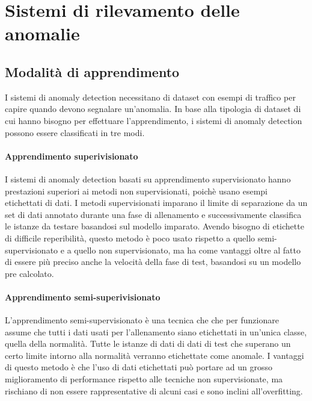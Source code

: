 \section{Sistemi di rilevamento delle anomalie}

\subsection{Modalità di apprendimento}


I sistemi di anomaly detection necessitano di dataset con esempi di traffico per capire quando devono segnalare un'anomalia. In base alla tipologia di dataset di cui hanno bisogno per effettuare l'apprendimento, i sistemi di anomaly detection possono essere classificati in tre modi.

\paragraph{Apprendimento superivisionato}

I sistemi di anomaly detection basati su apprendimento supervisionato hanno prestazioni superiori ai metodi non supervisionati, poichè usano esempi etichettati di dati. I metodi supervisionati imparano il limite di separazione da un set di dati annotato durante una fase di allenamento e successivamente classifica le istanze da testare basandosi sul modello imparato. Avendo bisogno di etichette di difficile reperibilità, questo metodo è poco usato rispetto a quello semi-supervisionato e a quello non supervisionato, ma ha come vantaggi oltre al fatto di essere più preciso anche la velocità della fase di test, basandosi su un modello pre calcolato.

\paragraph{Apprendimento semi-superivisionato}

L'apprendimento semi-supervisionato è una tecnica che che per funzionare assume che tutti i dati usati per l'allenamento siano etichettati in un'unica classe, quella della normalità. Tutte le istanze di dati di dati di test che superano un certo limite intorno alla normalità verranno etichettate come anomale. I vantaggi di questo metodo è che l'uso di dati etichettati può portare ad un grosso miglioramento di performance rispetto alle tecniche non supervisionate, ma rischiano di non essere rappresentative di alcuni casi e sono inclini all'overfitting.


